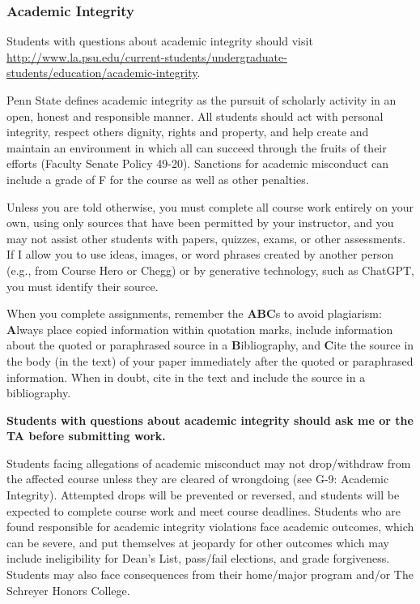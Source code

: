 \documentclass[
  letterpaper,
  DIV=11,
  numbers=noendperiod]{scrartcl}
\begin{document}
\subsubsection*{Academic Integrity}\label{academic-integrity}

Students with questions about academic integrity should visit
\url{http://www.la.psu.edu/current-students/undergraduate-students/education/academic-integrity}.

Penn State defines academic integrity as the pursuit of scholarly
activity in an open, honest and responsible manner. All students should
act with personal integrity, respect others dignity, rights and
property, and help create and maintain an environment in which all can
succeed through the fruits of their efforts (Faculty Senate Policy
49-20). Sanctions for academic misconduct can include a grade of F for
the course as well as other penalties.

Unless you are told otherwise, you must complete all course work
entirely on your own, using only sources that have been permitted by
your instructor, and you may not assist other students with papers,
quizzes, exams, or other assessments. If I allow you to use ideas,
images, or word phrases created by another person (e.g., from Course
Hero or Chegg) or by generative technology, such as ChatGPT, you must
identify their source.

When you complete assignments, remember the \textbf{ABC}s to avoid
plagiarism: \textbf{A}lways place copied information within quotation
marks, include information about the quoted or paraphrased source in a
\textbf{B}ibliography, and \textbf{C}ite the source in the body (in the
text) of your paper immediately after the quoted or paraphrased
information. When in doubt, cite in the text and include the source in a
bibliography.

\textbf{Students with questions about academic integrity should ask me
or the TA before submitting work.}

Students facing allegations of academic misconduct may not drop/withdraw
from the affected course unless they are cleared of wrongdoing (see G-9:
Academic Integrity). Attempted drops will be prevented or reversed, and
students will be expected to complete course work and meet course
deadlines. Students who are found responsible for academic integrity
violations face academic outcomes, which can be severe, and put
themselves at jeopardy for other outcomes which may include
ineligibility for Dean's List, pass/fail elections, and grade
forgiveness. Students may also face consequences from their home/major
program and/or The Schreyer Honors College.
\end{document}

